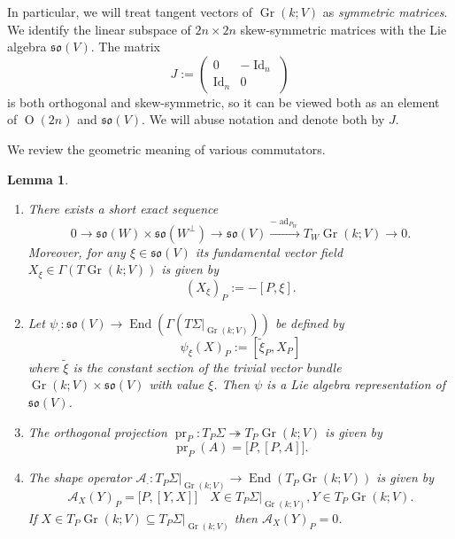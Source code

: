 \documentclass[12pt, final]{article}
\def\A{\mathcal{A}}
\def\pr{\operatorname{pr}}
\def\ad{\operatorname{ad}}
\def\End{\operatorname{End}}
\def\O{\operatorname{O}}
\def\Gr{\operatorname{Gr}}
\def\Id{\operatorname{Id}}
\def\so{\mathfrak{so}}
\newtheorem{lemma}[theorem]{Lemma}
\begin{document}
In particular, we will treat tangent vectors of $\Gr(k; V)$ as \emph{symmetric matrices}.
We identify the linear subspace of $2n \times 2n$ skew-symmetric matrices with the Lie algebra $\so(V)$. The matrix
\[ J:= \begin{pmatrix} 0 & -\Id_{n} \\  \Id_n & 0 \end{pmatrix}\]
is both orthogonal and skew-symmetric, so it can be viewed both as an element of $\O(2n)$ and $\so(V)$. We will abuse notation and denote both by $J$.

We review the geometric meaning of various commutators.
\begin{lemma}\label{lem:commutators}\
    \begin{enumerate}
        \item There exists a short exact sequence
        \[ 0 \to \so(W) \times \so(W^\perp) \to \so(V) \xrightarrow{-\ad_{P_W}} T_{W}\Gr(k; V) \to 0.\]
        Moreover, for any $\xi \in \so(V)$ its fundamental vector field $X_\xi \in \Gamma (T\Gr(k; V))$ is given by
        \[ (X_\xi)_P:= -[P, \xi].\]
        \item Let $\psi_\cdot : \so(V) \to \End (\Gamma(T\Sigma|_{\Gr(k; V)}))$ be defined by
        \[ \psi_\xi(X)_P:= [\widetilde{\xi}_P, X_P]\]
        where $\widetilde{\xi}$ is the constant section of the trivial vector bundle $\Gr(k; V) \times \so(V)$ with value $\xi$. Then $\psi$ is a Lie algebra representation of $\so(V)$.
         \item The orthogonal projection $\pr_P: T_P\Sigma\twoheadrightarrow T_P\Gr(k; V)$ is given by
        \[ \pr_P(A) = \big[P, [P, A]\big].\]
        \item The shape operator $\A_\cdot: T_P\Sigma|_{\Gr(k; V)} \to \End(T_P\Gr(k; V))$ is given by
        \[ \A_X (Y)_P = \big[P, [Y, X]\big] \quad X \in T_P\Sigma|_{\Gr(k; V)}, Y \in T_P\Gr(k; V).\]
        If $X \in T_P \Gr(k; V) \subseteq T_P\Sigma|_{\Gr(k; V)}$ then $\A_X(Y)_P = 0$.
       
    \end{enumerate}
\end{lemma}
\end{document}
